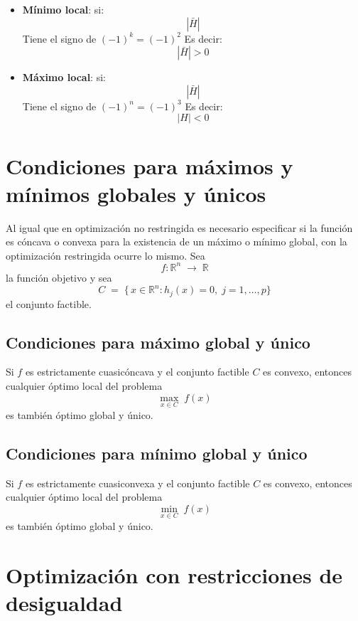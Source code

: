 \documentclass{article}
\begin{document}
\begin{itemize}\color{teal}
\item \textbf{Mínimo local}: si:
  \begin{equation*}
   |\bar{H}|
  \end{equation*}
  Tiene el signo de $(-1)^k=(-1)^2$ Es decir:
    \begin{equation*}
   |\bar{H}|>0
  \end{equation*}
  \item \textbf{Máximo local}:  si:
  \begin{equation*}
   |\bar{H}|
  \end{equation*}
  Tiene el signo de $(-1)^n=(-1)^3$ Es decir:
    \begin{equation*}
   |H|<0
  \end{equation*}
\end{itemize}


\section*{Condiciones para máximos y mínimos globales y únicos}
Al igual que en optimización no restringida es necesario especificar si la función es cóncava o convexa para la existencia de un máximo o mínimo global, con la optimización restringida ocurre lo mismo. Sea
\[
f: \mathbb{R}^n \;\longrightarrow\; \mathbb{R}
\]
la función objetivo y sea
\[
C \;=\; \bigl\{\,x \in \mathbb{R}^n : h_j(x)=0,\; j=1,\dots,p \bigr\}
\]
el conjunto factible. 
\subsection*{Condiciones para máximo global y único}


{\color{teal}Si \(f\) es estrictamente cuasicóncava y el conjunto factible \(C\) es convexo, entonces cualquier óptimo local del problema
  \[
    \max_{x\in C} \; f(x)
  \]
  es también óptimo global y único.}
 
\subsection*{Condiciones para mínimo global y único}

{\color{teal}Si \(f\) es estrictamente cuasiconvexa y el conjunto factible \(C\) es convexo, entonces cualquier óptimo local del problema
\[
  \min_{x\in C} \; f(x)
\]
es también óptimo global y único.}



\newpage
\section{Optimización con restricciones de desigualdad}
\end{document}
